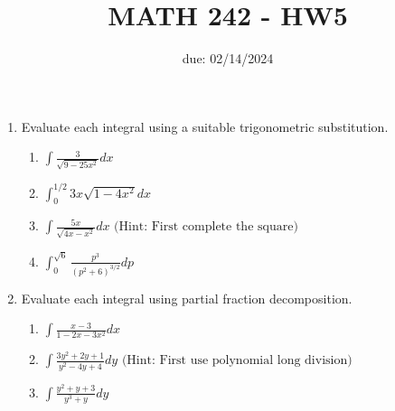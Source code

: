 \documentclass[12pt]{article}
\title{MATH 242 - HW5}
\date{due: 02/14/2024}
\begin{document}
\maketitle

\begin{enumerate}

\item Evaluate each integral using a suitable trigonometric substitution.
\begin{enumerate}
    \item $\int \frac{3}{\sqrt{9-25x^2}}dx$
    \vfill
    \item $\int_0^{1/2}3x\sqrt{1-4x^2}dx$
    \vfill
    \newpage
    \item $\int\frac{5x}{\sqrt{4x-x^2}}dx\text{ (Hint: First complete the square)}$
    \vfill
    \item $\int_0^{\sqrt{6}}\frac{p^3}{(p^2+6)^{3/2}}dp$
    \vfill
\end{enumerate}
\newpage
\item Evaluate each integral using partial fraction decomposition.
\begin{enumerate}
    \item $\int\frac{x-3}{1-2x-3x^2}dx$
    \vfill
    \item $\int\frac{3y^2+2y+1}{y^2-4y+4}dy\text{ (Hint: First use polynomial long division)}$
    \vfill
    \newpage
    \item $\int\frac{y^2+y+3}{y^3+y}dy$
\end{enumerate}
\end{enumerate}
\end{document}
